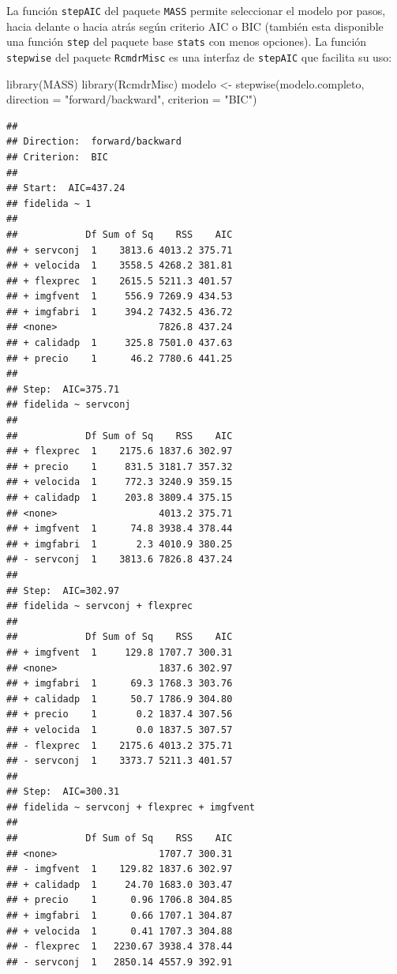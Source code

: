 \documentclass[
]{book}
\newenvironment{Shaded}{\begin{snugshade}}{\end{snugshade}}
\newcommand{\AttributeTok}[1]{\textcolor[rgb]{0.77,0.63,0.00}{#1}}
\newcommand{\FunctionTok}[1]{\textcolor[rgb]{0.00,0.00,0.00}{#1}}
\newcommand{\NormalTok}[1]{#1}
\newcommand{\OtherTok}[1]{\textcolor[rgb]{0.56,0.35,0.01}{#1}}
\newcommand{\StringTok}[1]{\textcolor[rgb]{0.31,0.60,0.02}{#1}}
\theoremstyle{break}
\begin{document}
La función \texttt{stepAIC} del paquete \texttt{MASS} permite seleccionar el modelo por pasos,
hacia delante o hacia atrás según criterio AIC o BIC (también esta disponible una función \texttt{step} del paquete base \texttt{stats} con menos opciones).
La función \texttt{stepwise} del paquete \texttt{RcmdrMisc} es una interfaz de \texttt{stepAIC}
que facilita su uso:

\begin{Shaded}
\begin{Highlighting}[]
\FunctionTok{library}\NormalTok{(MASS)}
\FunctionTok{library}\NormalTok{(RcmdrMisc)}
\NormalTok{modelo }\OtherTok{\textless{}{-}} \FunctionTok{stepwise}\NormalTok{(modelo.completo, }\AttributeTok{direction =} \StringTok{"forward/backward"}\NormalTok{, }\AttributeTok{criterion =} \StringTok{"BIC"}\NormalTok{)}
\end{Highlighting}
\end{Shaded}

\begin{verbatim}
## 
## Direction:  forward/backward
## Criterion:  BIC 
## 
## Start:  AIC=437.24
## fidelida ~ 1
## 
##            Df Sum of Sq    RSS    AIC
## + servconj  1    3813.6 4013.2 375.71
## + velocida  1    3558.5 4268.2 381.81
## + flexprec  1    2615.5 5211.3 401.57
## + imgfvent  1     556.9 7269.9 434.53
## + imgfabri  1     394.2 7432.5 436.72
## <none>                  7826.8 437.24
## + calidadp  1     325.8 7501.0 437.63
## + precio    1      46.2 7780.6 441.25
## 
## Step:  AIC=375.71
## fidelida ~ servconj
## 
##            Df Sum of Sq    RSS    AIC
## + flexprec  1    2175.6 1837.6 302.97
## + precio    1     831.5 3181.7 357.32
## + velocida  1     772.3 3240.9 359.15
## + calidadp  1     203.8 3809.4 375.15
## <none>                  4013.2 375.71
## + imgfvent  1      74.8 3938.4 378.44
## + imgfabri  1       2.3 4010.9 380.25
## - servconj  1    3813.6 7826.8 437.24
## 
## Step:  AIC=302.97
## fidelida ~ servconj + flexprec
## 
##            Df Sum of Sq    RSS    AIC
## + imgfvent  1     129.8 1707.7 300.31
## <none>                  1837.6 302.97
## + imgfabri  1      69.3 1768.3 303.76
## + calidadp  1      50.7 1786.9 304.80
## + precio    1       0.2 1837.4 307.56
## + velocida  1       0.0 1837.5 307.57
## - flexprec  1    2175.6 4013.2 375.71
## - servconj  1    3373.7 5211.3 401.57
## 
## Step:  AIC=300.31
## fidelida ~ servconj + flexprec + imgfvent
## 
##            Df Sum of Sq    RSS    AIC
## <none>                  1707.7 300.31
## - imgfvent  1    129.82 1837.6 302.97
## + calidadp  1     24.70 1683.0 303.47
## + precio    1      0.96 1706.8 304.85
## + imgfabri  1      0.66 1707.1 304.87
## + velocida  1      0.41 1707.3 304.88
## - flexprec  1   2230.67 3938.4 378.44
## - servconj  1   2850.14 4557.9 392.91
\end{verbatim}
\end{document}
